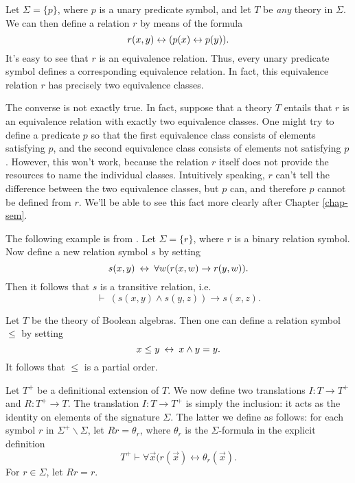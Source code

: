 \begin{example} Let $\Sigma = \{ p \}$, where $p$ is a unary predicate
  symbol, and let $T$ be \textit{any} theory in $\Sigma$.  We can then
  define a relation $r$ by means of the formula
  \[ r(x,y)\leftrightarrow (p(x)\leftrightarrow p(y)) .\] It's easy to see that $r$ is an
  equivalence relation.  Thus, every unary predicate symbol defines a
  corresponding equivalence relation.  In fact, this equivalence
  relation $r$ has precisely two equivalence classes.

  The converse is not exactly true.  In fact, suppose that a theory
  $T$ entails that $r$ is an equivalence relation with exactly two
  equivalence classes.  One might try to define a predicate $p$ so
  that the first equivalence class consists of elements satisfying
  $p$, and the second equivalence class consists of elements not
  satisfying $p$.  However, this won't work, because the relation $r$
  itself does not provide the resources to name the individual
  classes.  Intuitively speaking, $r$ can't tell the difference
  between the two equivalence classes, but $p$ can, and therefore $p$
  cannot be defined from $r$.  We'll be able to see this fact more
  clearly after Chapter \ref{chap-sem}.
\end{example}

\begin{example} The following example is from \cite{quine-goodman}.
  Let $\Sigma = \{ r\}$, where $r$ is a binary relation symbol.  Now
  define a new relation symbol $s$ by setting
  \[ s(x,y)\: \leftrightarrow \: \forall w(r(x,w)\to r(y,w)) .\]
  Then it follows that $s$ is a transitive relation, i.e.\
  \[ \vdash \: (s(x,y)\wedge s(y,z))\to s(x,z) .\]
\end{example}



\begin{example} Let $T$ be the theory of Boolean algebras.  Then one
  can define a relation symbol $\leq$ by setting
  \[ x\leq y \: \leftrightarrow \: x\wedge y=y .\] It follows that $\leq$ is a
  partial order. \end{example}


Let $T^+$ be a definitional extension of $T$.  We now define two
translations $I:T\to T^+$ and $R:T^+\to T$.  The translation
$I:T\to T^+$ is simply the inclusion: it acts as the identity on
elements of the signature $\Sigma$.  The latter we define as follows:
for each symbol $r$ in $\Sigma ^+\backslash \Sigma$, let
$Rr = \theta _r$, where $\theta _r$ is the $\Sigma$-formula in the
explicit definition
\[ T^+\vdash \forall \vec{x}(r(\vec{x})\leftrightarrow \theta
  _r(\vec{x}) .\] For $r\in \Sigma$, let $Rr=r$.

